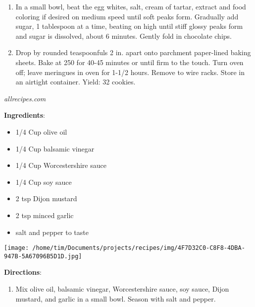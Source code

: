 \documentclass[11pt, twoside, openany]{book}
\begin{document}
\vspace{-3mm}\begin{enumerate}\setlength\itemsep{-1mm}
\item In a small bowl, beat the egg whites, salt, cream of tartar, extract and food coloring if desired on medium speed until soft peaks form. Gradually add sugar, 1 tablespoon at a time, beating on high until stiff glossy peaks form and sugar is dissolved, about 6 minutes. Gently fold in chocolate chips.
\item Drop by rounded teaspoonfuls 2 in. apart onto parchment paper-lined baking sheets. Bake at 250 for 40-45 minutes or until firm to the touch. Turn oven off; leave meringues in oven for 1-1/2 hours. Remove to wire racks. Store in an airtight container. Yield: 32 cookies.
\end{enumerate}
 \label{the-best-steak-marinade}\hfill\textit{allrecipes.com}\\
\begin{minipage}[t]{0.8\linewidth}
\textbf{Ingredients}:\vspace{-3mm}
\begin{multicols}{2}
\begin{itemize}\setlength\itemsep{-1mm}
\item 1/4 Cup olive oil
\item 1/4 Cup balsamic vinegar
\item 1/4 Cup Worcestershire sauce
\item 1/4 Cup soy sauce
\item 2 tsp Dijon mustard
\item 2 tsp minced garlic
\item salt and pepper to taste
\end{itemize}
\end{multicols}
\end{minipage}
\begin{minipage}[t]{0.2\linewidth}
\centering \strut\vspace*{-\baselineskip}\newline
\texttt{[image: /home/tim/Documents/projects/recipes/img/4F7D32C0-C8F8-4DBA-947B-5A67096B5D1D.jpg]}\\
\end{minipage}\vspace{3mm}
\textbf{Directions}:
\vspace{-3mm}\begin{enumerate}\setlength\itemsep{-1mm}
\item Mix olive oil, balsamic vinegar, Worcestershire sauce, soy sauce, Dijon mustard, and garlic in a small bowl. Season with salt and pepper.
\end{enumerate}
\end{document}
